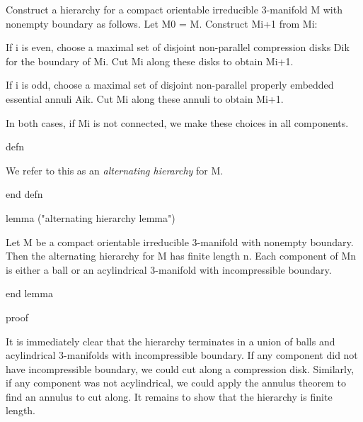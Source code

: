 Construct a hierarchy for a compact orientable irreducible 3-manifold M with
nonempty boundary as follows.  Let M0 = M.  Construct Mi+1 from Mi:

If i is even, choose a maximal set of disjoint non-parallel compression disks
Dik for the boundary of Mi. Cut Mi along these disks to obtain Mi+1.

If i is odd, choose a maximal set of disjoint non-parallel properly embedded
essential annuli Aik. Cut Mi along these annuli to obtain Mi+1.

In both cases, if Mi is not connected, we make these choices in all components.

defn

We refer to this as an \emph{alternating hierarchy} for M.

end defn

lemma ("alternating hierarchy lemma")

Let M be a compact orientable irreducible 3-manifold with nonempty boundary.
Then the alternating hierarchy for M has finite length n. Each component of Mn
is either a ball or an acylindrical 3-manifold with incompressible boundary.

end lemma

proof

It is immediately clear that the hierarchy terminates in a union of balls and
acylindrical 3-manifolds with incompressible boundary. If any component did not
have incompressible boundary, we could cut along a compression disk.
Similarly, if any component was not acylindrical, we could apply the annulus
theorem to find an annulus to cut along. It remains to show that the hierarchy
is finite length.


